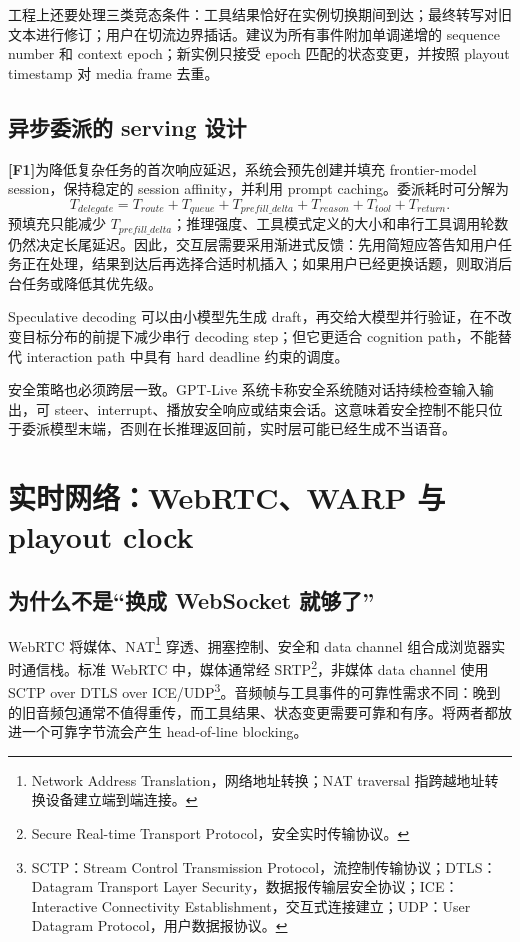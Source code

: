 \documentclass[UTF8,fontset=none,a4paper,10pt]{ctexart}
\newcommand{\FOne}{\textcolor{official}{\textbf{[F1]}}}
\begin{document}
工程上还要处理三类竞态条件：工具结果恰好在实例切换期间到达；最终转写对旧文本进行修订；用户在切流边界插话。建议为所有事件附加单调递增的 sequence number 和 context epoch；新实例只接受 epoch 匹配的状态变更，并按照 playout timestamp 对 media frame 去重。

\subsection{异步委派的 serving 设计}

\FOne 为降低复杂任务的首次响应延迟，系统会预先创建并填充 frontier-model session，保持稳定的 session affinity，并利用 prompt caching\cite{openai2026continuous}。委派耗时可分解为
\begin{equation}
T_{delegate}=T_{route}+T_{queue}+T_{prefill\_delta}+T_{reason}+T_{tool}+T_{return}.
\end{equation}
预填充只能减少 $T_{prefill\_delta}$；推理强度、工具模式定义的大小和串行工具调用轮数仍然决定长尾延迟。因此，交互层需要采用渐进式反馈：先用简短应答告知用户任务正在处理，结果到达后再选择合适时机插入；如果用户已经更换话题，则取消后台任务或降低其优先级。

Speculative decoding 可以由小模型先生成 draft，再交给大模型并行验证，在不改变目标分布的前提下减少串行 decoding step\cite{leviathan2023speculative}；但它更适合 cognition path，不能替代 interaction path 中具有 hard deadline 约束的调度。

安全策略也必须跨层一致。GPT-Live 系统卡称安全系统随对话持续检查输入输出，可 steer、interrupt、播放安全响应或结束会话\cite{openai2026safety}。这意味着安全控制不能只位于委派模型末端，否则在长推理返回前，实时层可能已经生成不当语音。

\section{实时网络：WebRTC、WARP 与 playout clock}

\subsection{为什么不是“换成 WebSocket 就够了”}

WebRTC 将媒体、NAT\footnote{Network Address Translation，网络地址转换；NAT traversal 指跨越地址转换设备建立端到端连接。} 穿透、拥塞控制、安全和 data channel 组合成浏览器实时通信栈。标准 WebRTC 中，媒体通常经 SRTP\footnote{Secure Real-time Transport Protocol，安全实时传输协议。}，非媒体 data channel 使用 SCTP over DTLS over ICE/UDP\footnote{SCTP：Stream Control Transmission Protocol，流控制传输协议；DTLS：Datagram Transport Layer Security，数据报传输层安全协议；ICE：Interactive Connectivity Establishment，交互式连接建立；UDP：User Datagram Protocol，用户数据报协议。}\cite{alvestrand2021webrtc,jesup2021datachannels}。音频帧与工具事件的可靠性需求不同：晚到的旧音频包通常不值得重传，而工具结果、状态变更需要可靠和有序。将两者都放进一个可靠字节流会产生 head-of-line blocking。
\end{document}
